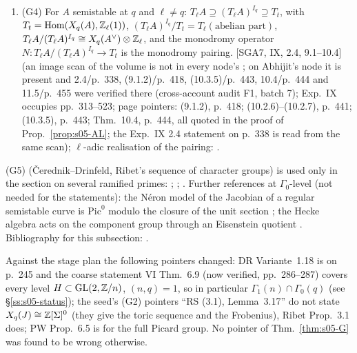 \begin{theorem}
\begin{enumerate}[label=(\roman*)]
{  scan)}; the thickness is DR VI Thm.~6.9(iii) as in (i), and $e(i)=|\mathrm{Aut}(\mathbf E)|/2$ in
  .
\item (G4) For $A$ semistable at $q$ and $\ell\ne q$: $T_\ell A\supseteq(T_\ell A)^{I_q}\supseteq T_t$, with
  $T_t=\operatorname{Hom}(X_q(A),\mathbb{Z}_\ell(1))$, $(T_\ell A)^{I_q}/T_t=T_\ell(\text{abelian part})$, $T_\ell A/(T_\ell A)^{I_q}\cong X_q(A^\vee)\otimes\mathbb{Z}_\ell$,
  and the monodromy operator $N:T_\ell A/(T_\ell A)^{I_q}\to T_t$ is the monodromy pairing.
  \stcited{} [SGA7, IX, 2.4, 9.1--10.4] (an image scan of the volume is not in every node's ; on Abhijit's node it is present and 2.4/p.~338, (9.1.2)/p.~418, (10.3.5)/p.~443, 10.4/p.~444 and 11.5/p.~455 were verified there (cross-account audit F1, batch 7); Exp.~IX occupies
  pp.~313--523; page pointers: (9.1.2), p.~418; (10.2.6)--(10.2.7), p.~441; (10.3.5), p.~443; Thm.~10.4, p.~444, all quoted in the proof of Prop.~\ref{prop:s05-AL}; the Exp.~IX 2.4 statement on p.~338 is read from the same scan);
  $\ell$-adic realisation of the pairing: .
\end{enumerate}
\end{theorem}
\noindent(G5) (Čerednik--Drinfeld, Ribet's sequence of character groups) is used only in the section on several ramified primes:
\stcited{} ; ;
.
Further references at $\Gamma_0$-level (not needed for the statements): the Néron model of the Jacobian of a regular semistable curve
is $\mathrm{Pic}^0$ modulo the closure of the unit section ; the Hecke algebra acts on the component group through an Eisenstein quotient
.
Bibliography for this subsection: \cite{DR,Ri90,RS,Mz,Koh01,PW,Ast196,Ill,BC,Ed91,Ray70,SGA7,Hs}.

\begin{remark}\label{rem:s05-Gverify}
Against the stage plan the following pointers changed: DR Variante~1.18 is on p.~245 and the coarse statement VI Thm.~6.9 (now
verified, pp.~286--287) covers every level $H\subset\mathrm{GL}(2,\mathbb{Z}/n)$, $(n,q)=1$, so in particular $\Gamma_1(n)\cap\Gamma_0(q)$ (see
\S\ref{ss:s05-status}); the seed's (G2) pointers ``RS (3.1), Lemma~3.17'' do not state $X_q(J)\cong\mathbb{Z}[\Sigma]^0$ (they give the
toric sequence and the Frobenius), Ribet Prop.~3.1 does; PW Prop.~6.5 is for the full Picard group. No pointer of
Thm.~\ref{thm:s05-G} was found to be wrong otherwise.
\end{remark}

